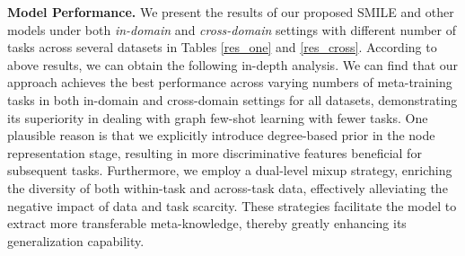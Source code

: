 \noindent \textbf{Model Performance.} 
We present the results of our proposed SMILE and other models under both \textit{in-domain} and \textit{cross-domain} settings with different number of tasks across several datasets in Tables \ref{res_one} and \ref{res_cross}. %
According to above results, we can obtain the following in-depth analysis. %
We can find that our approach achieves the best performance across varying numbers of meta-training tasks in both in-domain and cross-domain settings for all datasets, demonstrating its superiority in dealing with graph few-shot learning with fewer tasks. %
One plausible reason is that we explicitly introduce degree-based prior in the node representation stage, resulting in more discriminative features beneficial for subsequent tasks. Furthermore, we employ a dual-level mixup strategy, enriching the diversity of both within-task and across-task data, effectively alleviating the negative impact of data and task scarcity. These strategies facilitate the model to extract more transferable meta-knowledge, thereby greatly enhancing its generalization capability.


